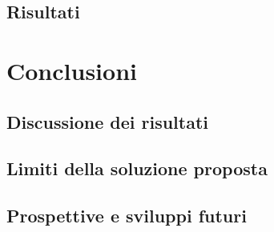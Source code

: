 \documentclass[12pt]{report}
\begin{document}
\section{Risultati}
\label{sec:risultati}

\chapter{Conclusioni}
\label{chap:conclusioni}

\section{Discussione dei risultati}
\label{sec:discussione_risultati}

\section{Limiti della soluzione proposta}
\label{sec:limiti}

\section{Prospettive e sviluppi futuri}
\label{sec:prospettive}

\beforebibliography



\closingpage
\end{document}
